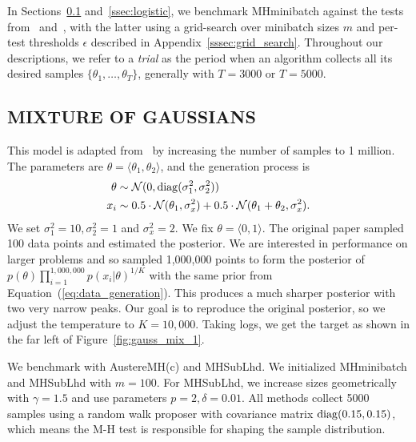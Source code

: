 \documentclass[letterpaper]{article}
\begin{document}
In Sections~\ref{ssec:gaussians} and~\ref{ssec:logistic}, we benchmark {\sc
MHminibatch} against the tests from~\citep{icml2014c1_bardenet14}
and~\citep{cutting_mh_2014}, with the latter using a grid-search over minibatch
sizes $m$ and per-test thresholds $\epsilon$ described in
Appendix~\ref{sssec:grid_search}. Throughout our descriptions, we refer to a
\emph{trial} as the period when an algorithm collects all its desired samples
$\{\theta_1,\ldots,\theta_T\}$, generally with $T=3000$ or $T=5000$.

\subsection{MIXTURE OF GAUSSIANS}\label{ssec:gaussians}

This model is adapted from~\citep{langevin_2011} by increasing the number of
samples to 1 million.  The parameters are $\theta = \langle \theta_1,\theta_2
\rangle$, and the generation process is
\begin{equation}\label{eq:data_generation}
\begin{split}
    \theta &\sim \mathcal{N}(0, {\rm diag}(\sigma_1^2,\sigma_2^2)) \\
    x_i & \sim 0.5 \cdot \mathcal{N}(\theta_1, \sigma_x^2) + 0.5 \cdot \mathcal{N}(\theta_1+\theta_2, \sigma_x^2).
\end{split}
\end{equation}
We set $\sigma_1^2 = 10, \sigma_2^2 = 1$ and $\sigma_x^2=2$.  We fix $\theta =
\langle 0,1 \rangle$. The original paper sampled 100 data points and estimated
the posterior. We are interested in performance on larger problems and so
sampled 1,000,000 points to form the posterior of
$p(\theta)\prod_{i=1}^{1,000,000}p(x_i | \theta)^{1/K}$ with the same prior from
Equation~(\ref{eq:data_generation}). This produces a much sharper posterior with
two very narrow peaks.  Our goal is to reproduce the original posterior, so we
adjust the temperature to $K=10,000$.  Taking logs, we get the target as shown
in the far left of Figure~\ref{fig:gauss_mix_1}.

We benchmark with {\sc AustereMH(c)} and {\sc MHSubLhd}. We initialized {\sc
MHminibatch} and {\sc MHSubLhd} with $m=100$. For {\sc MHSubLhd}, we increase
sizes geometrically with $\gamma = 1.5$ and use parameters $p = 2, \delta =
0.01$.  All methods collect 5000 samples using a random walk proposer with
covariance matrix ${\rm diag}(0.15, 0.15)$, which means the M-H test is
responsible for shaping the sample distribution.
\end{document}
